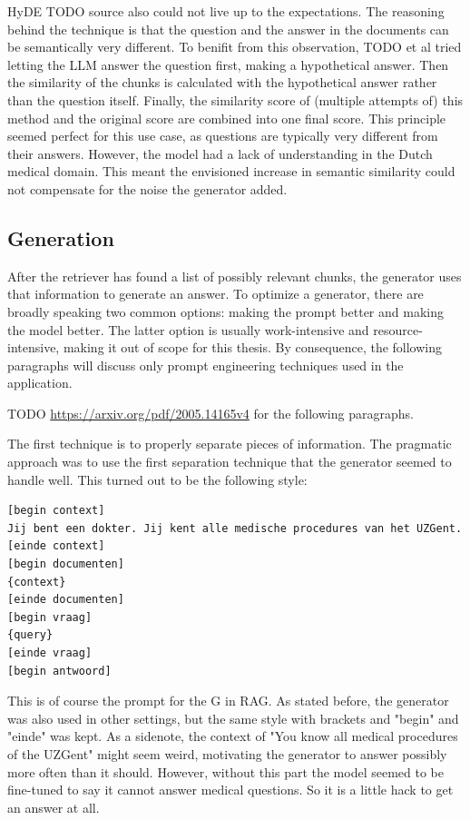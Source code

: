 HyDE TODO source also could not live up to the expectations. The reasoning behind the technique is that the question and the answer in the documents can be semantically very different. To benifit from this observation, TODO et al tried letting the LLM answer the question first, making a hypothetical answer. Then the similarity of the chunks is calculated with the hypothetical answer rather than the question itself. Finally, the similarity score of (multiple attempts of) this method and the original score are combined into one final score. This principle seemed perfect for this use case, as questions are typically very different from their answers. However, the model had a lack of understanding in the Dutch medical domain. This meant the envisioned increase in semantic similarity could not compensate for the noise the generator added.

\subsection{Generation}
After the retriever has found a list of possibly relevant chunks, the generator uses that information to generate an answer. To optimize a generator, there are broadly speaking two common options: making the prompt better and making the model better. The latter option is usually work-intensive and resource-intensive, making it out of scope for this thesis. By consequence, the following paragraphs will discuss only prompt engineering techniques used in the application.

TODO \url{https://arxiv.org/pdf/2005.14165v4} for the following paragraphs.

The first technique is to properly separate pieces of information. The pragmatic approach was to use the first separation technique that the generator seemed to handle well. This turned out to be the following style:
\begin{verbatim}
[begin context]
Jij bent een dokter. Jij kent alle medische procedures van het UZGent.
[einde context]
[begin documenten]
{context}
[einde documenten]
[begin vraag]
{query}
[einde vraag]
[begin antwoord]
\end{verbatim}
This is of course the prompt for the G in RAG. As stated before, the generator was also used in other settings, but the same style with brackets and "begin" and "einde" was kept. As a sidenote, the context of "You know all medical procedures of the UZGent" might seem weird, motivating the generator to answer possibly more often than it should. However, without this part the model seemed to be fine-tuned to say it cannot answer medical questions. So it is a little hack to get an answer at all.

